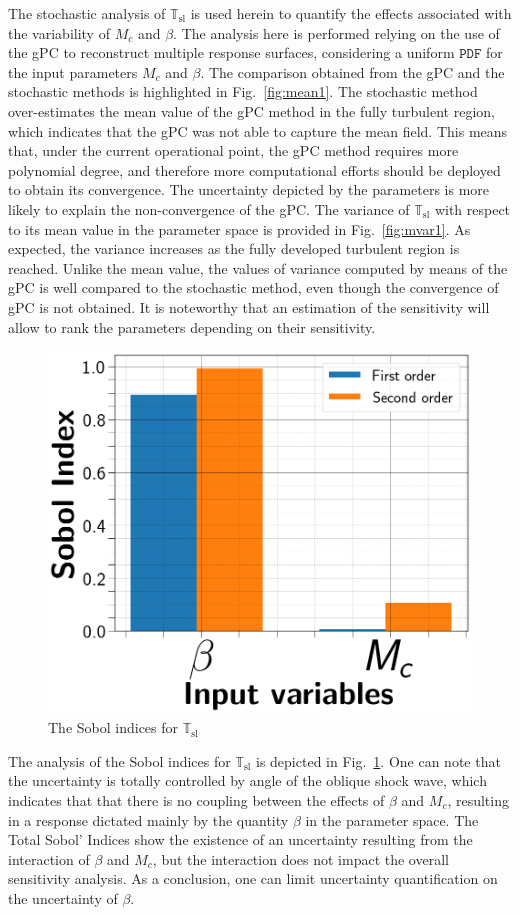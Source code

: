 \documentclass[conf]{new-aiaa}
\begin{document}
%
The stochastic analysis of $\mathbb{T}_\mathrm{sl}$ is used herein to quantify the effects associated with the variability of $M_c$ and $\beta$.
%
The analysis here is performed relying on the use of the gPC to reconstruct multiple response surfaces, considering a uniform $\texttt{PDF}$ for the input parameters $M_c$ and $\beta$.
%
The comparison obtained from the gPC and the stochastic methods is highlighted in Fig.~\ref{fig:mean1}.
%
The stochastic method over-estimates the mean value of the gPC method in the fully turbulent region, which indicates that the gPC was not able to capture the mean field.
%
This means that, under the current operational point, the gPC method requires more polynomial degree, and therefore more computational efforts should be deployed to obtain its convergence.
%
The uncertainty depicted by the parameters is more likely to explain the non-convergence of the gPC.
The variance of $\mathbb{T}_\mathrm{sl}$ with respect to its mean value in the parameter space is provided in Fig.~\ref{fig:mvar1}.
%
As expected, the variance increases as the fully developed turbulent region is reached.
%
Unlike the mean value, the values of variance computed by means of the gPC is well compared to the stochastic method, even though the convergence of gPC is not obtained.
%
It is noteworthy that an estimation of the sensitivity will allow to rank the parameters depending on their sensitivity. 
%

%
\begin{figure}[!ht]
\centering
\includegraphics[width=0.49\columnwidth]{figs/sobol.png}
\caption{The Sobol indices for $\mathbb{T}_\mathrm{sl}$} 
\label{fig:tmeansobol}
\end{figure}
%
The analysis of the Sobol indices for  $\mathbb{T}_\mathrm{sl}$ is depicted in Fig.~\ref{fig:tmeansobol}.
%
One can note that the uncertainty is totally controlled by angle of the oblique shock wave, which 
indicates that that there is no coupling between the effects of $\beta$ and $M_c$, resulting in a  response dictated mainly by the quantity $\beta$ in the parameter space.
%
The Total Sobol’ Indices show the existence of an uncertainty resulting from the interaction of $\beta$ and $M_c$, but the interaction does not impact the overall sensitivity analysis.
%
As a conclusion, one can limit uncertainty quantification on the uncertainty of $\beta$. 
\end{document}
